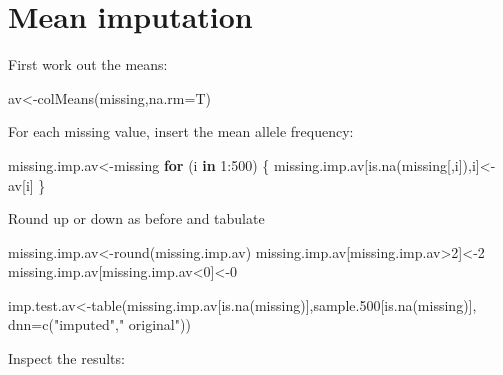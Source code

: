 \documentclass[
]{book}
\newenvironment{Shaded}{\begin{snugshade}}{\end{snugshade}}
\newcommand{\AttributeTok}[1]{\textcolor[rgb]{0.77,0.63,0.00}{#1}}
\newcommand{\ControlFlowTok}[1]{\textcolor[rgb]{0.13,0.29,0.53}{\textbf{#1}}}
\newcommand{\DecValTok}[1]{\textcolor[rgb]{0.00,0.00,0.81}{#1}}
\newcommand{\FloatTok}[1]{\textcolor[rgb]{0.00,0.00,0.81}{#1}}
\newcommand{\FunctionTok}[1]{\textcolor[rgb]{0.00,0.00,0.00}{#1}}
\newcommand{\NormalTok}[1]{#1}
\newcommand{\OtherTok}[1]{\textcolor[rgb]{0.56,0.35,0.01}{#1}}
\newcommand{\SpecialCharTok}[1]{\textcolor[rgb]{0.00,0.00,0.00}{#1}}
\newcommand{\StringTok}[1]{\textcolor[rgb]{0.31,0.60,0.02}{#1}}
\begin{document}
\hypertarget{mean-imputation}{%
\section{Mean imputation}\label{mean-imputation}}

First work out the means:

\begin{Shaded}
\begin{Highlighting}[]
\NormalTok{av}\OtherTok{\textless{}{-}}\FunctionTok{colMeans}\NormalTok{(missing,}\AttributeTok{na.rm=}\NormalTok{T)   }
\end{Highlighting}
\end{Shaded}

For each missing value, insert the mean allele frequency:

\begin{Shaded}
\begin{Highlighting}[]
\NormalTok{missing.imp.av}\OtherTok{\textless{}{-}}\NormalTok{missing }
\ControlFlowTok{for}\NormalTok{ (i }\ControlFlowTok{in} \DecValTok{1}\SpecialCharTok{:}\DecValTok{500}\NormalTok{) \{}
\NormalTok{  missing.imp.av[}\FunctionTok{is.na}\NormalTok{(missing[,i]),i]}\OtherTok{\textless{}{-}}\NormalTok{av[i]   }
\NormalTok{\} }
\end{Highlighting}
\end{Shaded}

Round up or down as before and tabulate

\begin{Shaded}
\begin{Highlighting}[]
\NormalTok{missing.imp.av}\OtherTok{\textless{}{-}}\FunctionTok{round}\NormalTok{(missing.imp.av)}
\NormalTok{missing.imp.av[missing.imp.av}\SpecialCharTok{\textgreater{}}\DecValTok{2}\NormalTok{]}\OtherTok{\textless{}{-}}\DecValTok{2}
\NormalTok{missing.imp.av[missing.imp.av}\SpecialCharTok{\textless{}}\DecValTok{0}\NormalTok{]}\OtherTok{\textless{}{-}}\DecValTok{0}

\NormalTok{imp.test.av}\OtherTok{\textless{}{-}}\FunctionTok{table}\NormalTok{(missing.imp.av[}\FunctionTok{is.na}\NormalTok{(missing)],sample}\FloatTok{.500}\NormalTok{[}\FunctionTok{is.na}\NormalTok{(missing)],}
                   \AttributeTok{dnn=}\FunctionTok{c}\NormalTok{(}\StringTok{"imputed"}\NormalTok{,}\StringTok{"       original"}\NormalTok{))}
\end{Highlighting}
\end{Shaded}

Inspect the results:
\end{document}
